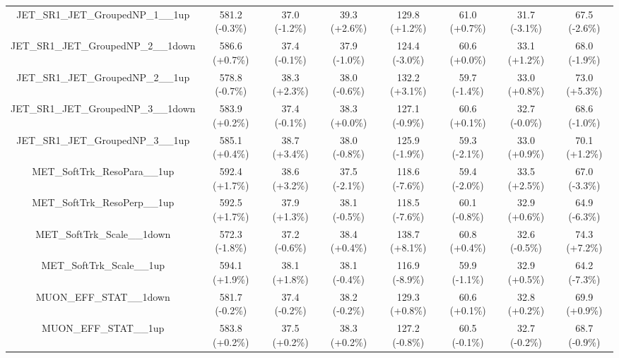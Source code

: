 \begin{table}[htbp!]
\begin{tiny}
\begin{center}
\begin{tabular}{c|c|c|c||c|c|c|c}
JET\_SR1\_JET\_GroupedNP\_1\_\_1up                           & 581.2     (-0.3\%) & 37.0      (-1.2\%) & 39.3      (+2.6\%) & 129.8     (+1.2\%) & 61.0      (+0.7\%) & 31.7      (-3.1\%) & 67.5      (-2.6\%) \\ 
JET\_SR1\_JET\_GroupedNP\_2\_\_1down                         & 586.6     (+0.7\%) & 37.4      (-0.1\%) & 37.9      (-1.0\%) & 124.4     (-3.0\%) & 60.6      (+0.0\%) & 33.1      (+1.2\%) & 68.0      (-1.9\%) \\ 
JET\_SR1\_JET\_GroupedNP\_2\_\_1up                           & 578.8     (-0.7\%) & 38.3      (+2.3\%) & 38.0      (-0.6\%) & 132.2     (+3.1\%) & 59.7      (-1.4\%) & 33.0      (+0.8\%) & 73.0      (+5.3\%) \\ 
JET\_SR1\_JET\_GroupedNP\_3\_\_1down                         & 583.9     (+0.2\%) & 37.4      (-0.1\%) & 38.3      (+0.0\%) & 127.1     (-0.9\%) & 60.6      (+0.1\%) & 32.7      (-0.0\%) & 68.6      (-1.0\%) \\ 
JET\_SR1\_JET\_GroupedNP\_3\_\_1up                           & 585.1     (+0.4\%) & 38.7      (+3.4\%) & 38.0      (-0.8\%) & 125.9     (-1.9\%) & 59.3      (-2.1\%) & 33.0      (+0.9\%) & 70.1      (+1.2\%) \\ 
MET\_SoftTrk\_ResoPara\_\_1up                                & 592.4     (+1.7\%) & 38.6      (+3.2\%) & 37.5      (-2.1\%) & 118.6     (-7.6\%) & 59.4      (-2.0\%) & 33.5      (+2.5\%) & 67.0      (-3.3\%) \\ 
MET\_SoftTrk\_ResoPerp\_\_1up                                & 592.5     (+1.7\%) & 37.9      (+1.3\%) & 38.1      (-0.5\%) & 118.5     (-7.6\%) & 60.1      (-0.8\%) & 32.9      (+0.6\%) & 64.9      (-6.3\%) \\ 
MET\_SoftTrk\_Scale\_\_1down                                 & 572.3     (-1.8\%) & 37.2      (-0.6\%) & 38.4      (+0.4\%) & 138.7     (+8.1\%) & 60.8      (+0.4\%) & 32.6      (-0.5\%) & 74.3      (+7.2\%) \\ 
MET\_SoftTrk\_Scale\_\_1up                                   & 594.1     (+1.9\%) & 38.1      (+1.8\%) & 38.1      (-0.4\%) & 116.9     (-8.9\%) & 59.9      (-1.1\%) & 32.9      (+0.5\%) & 64.2      (-7.3\%) \\ 
MUON\_EFF\_STAT\_\_1down                                     & 581.7     (-0.2\%) & 37.4      (-0.2\%) & 38.2      (-0.2\%) & 129.3     (+0.8\%) & 60.6      (+0.1\%) & 32.8      (+0.2\%) & 69.9      (+0.9\%) \\ 
MUON\_EFF\_STAT\_\_1up                                       & 583.8     (+0.2\%) & 37.5      (+0.2\%) & 38.3      (+0.2\%) & 127.2     (-0.8\%) & 60.5      (-0.1\%) & 32.7      (-0.2\%) & 68.7      (-0.9\%) \\ 

\end{tabular}
\end{center}
\end{tiny}
\end{table}
